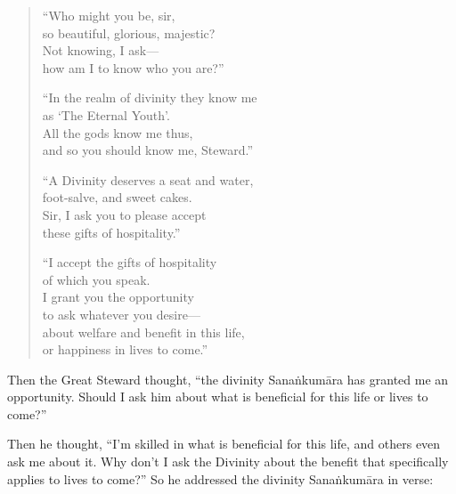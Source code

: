 \documentclass[12pt,openany]{book}%
\begin{document}
\begin{verse}%
“Who might you be, sir, \\
so beautiful, glorious, majestic? \\
Not knowing, I ask—\\
how am I to know who you are?” 

“In the realm of divinity they know me \\
as ‘The Eternal Youth’. \\
All the gods know me thus, \\
and so you should know me, Steward.” 

“A Divinity deserves a seat and water, \\
foot-salve, and sweet cakes. \\
Sir, I ask you to please accept \\
these gifts of hospitality.” 

“I accept the gifts of hospitality \\
of which you speak. \\
I grant you the opportunity \\
to ask whatever you desire—\\
about welfare and benefit in this life, \\
or happiness in lives to come.” 

%
\end{verse}

Then the Great Steward thought, “the divinity \textsanskrit{Sanaṅkumāra} has granted me an opportunity. Should I ask him about what is beneficial for this life or lives to come?” 

Then he thought, “I’m skilled in what is beneficial for this life, and others even ask me about it. Why don’t I ask the Divinity about the benefit that specifically applies to lives to come?” So he addressed the divinity \textsanskrit{Sanaṅkumāra} in verse: 
\end{document}
